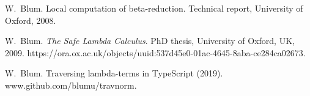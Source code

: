 \documentclass[xchauthor,chkrefs,GCNS,amsmath,amsthm,rotating,leaveRGB]{tcsg}
\theoremstyle{plain}
\theoremstyle{definition}
\begin{document}
\begin{backmatter}
\begin{thebibliography}{}
\begin{bsubitem}
\begin{bcontribution}%
\end{bcontribution}
\prnsep{,\ }
\begin{bhost}
\begin{bbook}[class=report]
\end{bbook}
\end{bhost}
\end{bsubitem}
%
\OrigBibText
W.~Blum.
 Local computation of beta-reduction.
 Technical report, University of Oxford, 2008.
\endOrigBibText
{}%
\endbibitem

\begin{bsubitem}
\begin{bcontribution}%
\end{bcontribution}
\prnsep{,\ }
\begin{bhost}
\begin{bbook}[class=report]
\end{bbook}
\end{bhost}
\begin{bhost}
\begin{behost}
\end{behost}
\end{bhost}
\end{bsubitem}
%
\OrigBibText
W.~Blum.
 \emph{The Safe Lambda Calculus}.
 PhD thesis, University of Oxford, UK, 2009.
 https://ora.ox.ac.uk/objects/uuid:537d45e0-01ac-4645-8aba-ce284ca02673.
\endOrigBibText
{}%
\endbibitem

\begin{bsubitem}
\begin{bcontribution}%
\end{bcontribution}
\begin{bhost}
\begin{behost}
\end{behost}
\end{bhost}
\end{bsubitem}
%
\OrigBibText
W.~Blum.
 Traversing lambda-terms in {T}ype{S}cript (2019).
 www.github.com/blumu/travnorm.
\endOrigBibText
{}%
\endbibitem


\end{thebibliography}
\end{backmatter}
\end{document}
